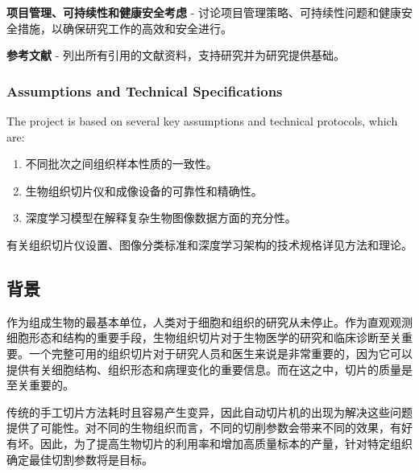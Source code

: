 \textbf{项目管理、可持续性和健康安全考虑} - 讨论项目管理策略、可持续性问题和健康安全措施，以确保研究工作的高效和安全进行。

\textbf{参考文献} - 列出所有引用的文献资料，支持研究并为研究提供基础。

\subsubsection{Assumptions and Technical Specifications}

The project is based on several key assumptions and technical protocols, which are:


\begin{enumerate}
    \item 不同批次之间组织样本性质的一致性。
    \item 生物组织切片仪和成像设备的可靠性和精确性。
    \item 深度学习模型在解释复杂生物图像数据方面的充分性。
\end{enumerate}
有关组织切片仪设置、图像分类标准和深度学习架构的技术规格详见方法和理论。

\subsection{背景}

作为组成生物的最基本单位，人类对于细胞和组织的研究从未停止。作为直观观测细胞形态和结构的重要手段，生物组织切片对于生物医学的研究和临床诊断至关重要。一个完整可用的组织切片对于研究人员和医生来说是非常重要的，因为它可以提供有关细胞结构、组织形态和病理变化的重要信息。而在这之中，切片的质量是至关重要的。

传统的手工切片方法耗时且容易产生变异，因此自动切片机的出现为解决这些问题提供了可能性。对不同的生物组织而言，不同的切削参数会带来不同的效果，有好有坏。因此，为了提高生物切片的利用率和增加高质量标本的产量，针对特定组织确定最佳切割参数将是目标。

